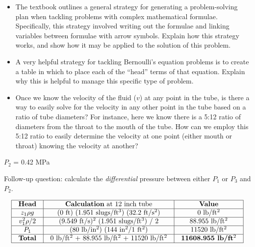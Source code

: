 \begin{itemize}
\item{} The textbook outlines a general strategy for generating a problem-solving plan when tackling problems with complex mathematical formulae.  Specifically, this strategy involved writing out the formulae and linking variables between formulae with arrow symbols.  Explain how this strategy works, and show how it may be applied to the solution of this problem.
\item{} A very helpful strategy for tackling Bernoulli's equation problems is to create a table in which to place each of the ``head'' terms of that equation.  Explain why this is helpful to manage this specific type of problem.
\item{} Once we know the velocity of the fluid ($v$) at any point in the tube, is there a way to easily solve for the velocity in any other point in the tube based on a ratio of tube diameters?  For instance, here we know there is a 5:12 ratio of diameters from the throat to the mouth of the tube.  How can we employ this 5:12 ratio to easily determine the velocity at one point (either mouth or throat) knowing the velocity at another?
\end{itemize}







$P_2$ = 0.42 MPa     

\vskip 10pt


Follow-up question: calculate the {\it differential} pressure between either $P_1$ or $P_3$ and $P_2$.








$$\vbox{\offinterlineskip
\halign{\strut
\vrule \quad\hfil # \ \hfil & 
\vrule \quad\hfil # \ \hfil & 
\vrule \quad\hfil # \ \hfil \vrule \cr
\noalign{\hrule}
%
{\bf Head} & {\bf Calculation} at 12 inch tube & {\bf Value} \cr
%
\noalign{\hrule}
%
$z_1 \rho g$ & (0 ft) (1.951 slugs/ft$^{3}$) (32.2 ft/s$^{2}$) & 0 lb/ft$^{2}$ \cr
%
\noalign{\hrule}
%
$v_1^2 \rho / 2$ & (9.549 ft/s)$^{2}$ (1.951 slugs/ft$^{3}$) / 2 & 88.955 lb/ft$^{2}$ \cr
%
\noalign{\hrule}
%
$P_1$ & (80 lb/in$^{2}$) (144 in$^{2}$/1 ft$^{2}$) & 11520 lb/ft$^{2}$ \cr
%
\noalign{\hrule}
%
{\bf Total} &  0 lb/ft$^{2}$ + 88.955 lb/ft$^{2}$ + 11520 lb/ft$^{2}$ & {\bf 11608.955 lb/ft$^{2}$} \cr
%
\noalign{\hrule}
} %
}$$ %

